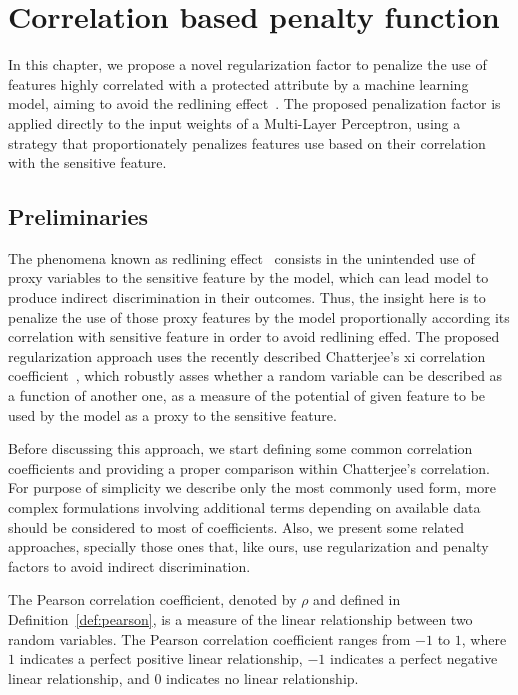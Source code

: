 \chapter{Correlation based penalty function}\label{chap:rpr}

In this chapter, we propose a novel regularization factor to penalize the use of features highly correlated with a protected attribute by a machine learning model, aiming to avoid the redlining effect~\citep{Pedreschi2008}. The proposed penalization factor is applied directly to the input weights of a Multi-Layer Perceptron, using a strategy that proportionately penalizes features use based on their correlation with the sensitive feature.

\section{Preliminaries} \label{sec:rpr_preliminaries}

The phenomena known as redlining effect~\citep{Pedreschi2008} consists in the unintended use of proxy variables to the sensitive feature by the model, which can lead model to produce indirect discrimination in their outcomes.  Thus, the insight here is to penalize the use of those proxy features by the model proportionally according its correlation with sensitive feature in order to avoid redlining effed. The proposed regularization approach uses the recently described Chatterjee's xi correlation coefficient~\cite{chatterjee2020new}, which robustly asses whether a random variable can be described as a function of another one, as a measure of the potential of given feature to be used by the model as a proxy to the sensitive feature. 

Before discussing this approach, we start defining some common correlation coefficients and providing a proper comparison within Chatterjee's correlation. For purpose of simplicity we describe only the most commonly used form, more complex formulations involving additional terms depending on available data should be considered to most of coefficients. Also, we present some related approaches, specially those ones that, like ours, use regularization and penalty factors to avoid indirect discrimination.

The Pearson correlation coefficient, denoted by $\rho$ and defined in Definition~\ref{def:pearson}, is a measure of the linear relationship between two random variables. The Pearson correlation coefficient ranges from $-1$ to $1$, where $1$ indicates a perfect positive linear relationship, $-1$ indicates a perfect negative linear relationship, and $0$ indicates no linear relationship.

